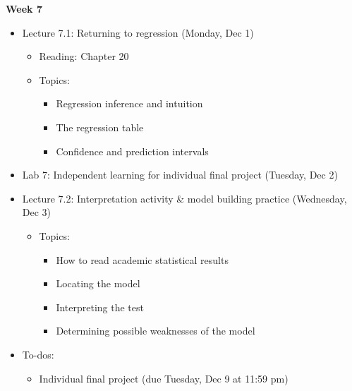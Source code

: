 \documentclass[11pt]{article}
\begin{document}
\textbf{Week 7}
\begin{itemize}
    \item Lecture 7.1: Returning to regression (Monday, Dec 1)
    \begin{itemize}
        \item Reading: Chapter 20
        \item Topics:
        \begin{itemize}
            \item Regression inference and intuition
            \item The regression table
            \item Confidence and prediction intervals
        \end{itemize}
    \end{itemize}
    \item Lab 7: Independent learning for individual final project (Tuesday, Dec 2)
    \item Lecture 7.2: Interpretation activity \& model building practice (Wednesday, Dec 3)
    \begin{itemize}
        \item Topics:
        \begin{itemize}
            \item How to read academic statistical results
            \item Locating the model
            \item Interpreting the test
            \item Determining possible weaknesses of the model
        \end{itemize}
    \end{itemize}
    \item To-dos: 
    \begin{itemize}
        \item Individual final project (due Tuesday, Dec 9 at 11:59 pm)
    \end{itemize}
\end{itemize}
\end{document}
